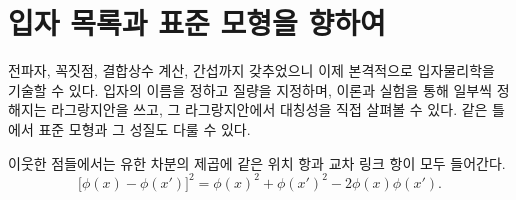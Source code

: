 \section{입자 목록과 표준 모형을 향하여}

전파자, 꼭짓점, 결합상수 계산, 간섭까지 갖추었으니 이제 본격적으로 입자물리학을 기술할 수 있다. 입자의 이름을 정하고 질량을 지정하며, 이론과 실험을 통해 일부씩 정해지는 라그랑지안을 쓰고, 그 라그랑지안에서 대칭성을 직접 살펴볼 수 있다. 같은 틀에서 표준 모형과 그 성질도 다룰 수 있다.

\begin{classroomqa}
\end{classroomqa}

\begin{classroomqa}
\end{classroomqa}

이웃한 점들에서는 유한 차분의 제곱에 같은 위치 항과 교차 링크 항이 모두 들어간다.
\begin{equation}
\bigl[\phi(x)-\phi(x')\bigr]^2
=
\phi(x)^2+\phi(x')^2-2\phi(x)\phi(x').
\end{equation}

\begin{classroomqa}
\end{classroomqa}
